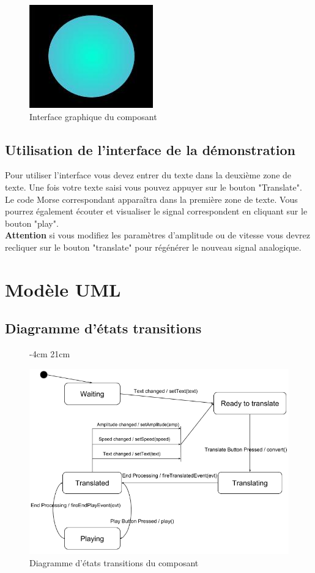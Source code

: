 \documentclass[a4paper,11pt]{article}
\begin{document}
	\begin{figure}[H]
		\begin{center}
			\includegraphics[scale=0.8]{comdescpicture.jpg}
			\caption{Interface graphique du composant}
			\label{Interface graphique du composant}
		\end{center}
	\end{figure}
    \subsection{Utilisation de l'interface de la démonstration}
    Pour utiliser l'interface vous devez entrer du texte dans la deuxième zone de texte. Une fois votre texte saisi vous pouvez appuyer sur le bouton "Translate". Le code Morse correspondant apparaîtra dans la première zone de texte. Vous pourrez également écouter et visualiser le signal correspondent en cliquant sur le bouton "play".\\
    \textbf{Attention} si vous modifiez les paramètres d'amplitude ou de vitesse vous devrez recliquer sur le bouton "translate" pour régénérer le nouveau signal analogique.
    

    \section{Modèle UML}
    \subsection{Diagramme d'états transitions}
     \begin{figure}[H]
    	 -4cm 21cm
    	\begin{center}
    		\includegraphics[scale=0.8]{etatsdiag.png}
    		\caption{Diagramme d'états transitions du composant}
    		\label{Diagramme d'états transitions du composant}
    	\end{center}
    \end{figure}
\end{document}
